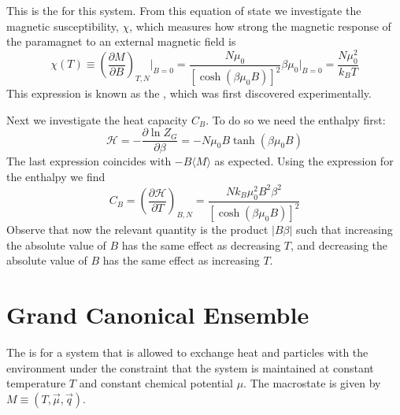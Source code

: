 \documentclass[12pt, a4paper, oneside, openright, titlepage]{book}
\begin{document}
This is the  for this system. From this equation of state we investigate the magnetic susceptibility, $\chi$, which measures how strong the magnetic response of the paramagnet to an external magnetic field is \begin{equation*}
    \chi(T) \equiv\left(\frac{\partial M}{\partial B}\right)_{T,N}\Big\rvert_{B=0} = \frac{N\mu_0}{[\cosh(\beta\mu_0B)]^2}\beta\mu_0\Big\vert_{B=0} = \frac{N\mu_0^2}{k_BT}
\end{equation*}
This expression is known as the , which was first discovered experimentally.

Next we investigate the heat capacity $C_B$. To do so we need the enthalpy first: \begin{equation*}
    \mathcal{H} = -\frac{\partial \ln Z_G}{\partial \beta} = -N\mu_0B\tanh(\beta\mu_0B)
\end{equation*}
The last expression coincides with $-B\langle M\rangle$ as expected. Using the expression for the enthalpy we find \begin{equation*}
    C_B = \left(\frac{\partial \mathcal{H}}{\partial T}\right)_{B,N} = \frac{Nk_B\mu_0^2B^2\beta^2}{[\cosh(\beta\mu_0B)]^2}
\end{equation*}
Observe that now the relevant quantity is the product $|B\beta|$ such that increasing the absolute value of $B$ has the same effect as decreasing $T$, and decreasing the absolute value of $B$ has the same effect as increasing $T$.


\section{Grand Canonical Ensemble}

The  is for a system that is allowed to exchange heat and particles with the environment under the constraint that the system is maintained at constant temperature $T$ and constant chemical potential $\mu$. The macrostate is given by $M \equiv (T,\vec{\mu},\vec{q})$. 
\end{document}
